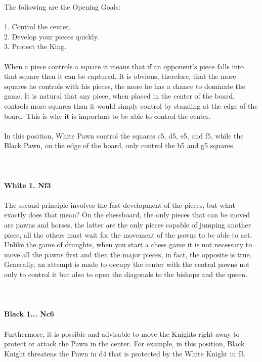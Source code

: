 \documentclass{article}
\begin{document}
The following are the Opening Goals:\\\\1. Control the center.\\2. Develop your pieces quickly.\\3. Protect the King.\\\\When a piece controls a square it means that if an opponent's piece falls into that square then it can be captured. It is obvious, therefore, that the more squares he controls with his pieces, the more he has a chance to dominate the game. It is natural that any piece, when placed in the center of the board, controls more squares than it would simply control by standing at the edge of the board. This is why it is important to be able to control the center.\\\\In this position, White Pawn control the squares c5, d5, e5, and f5, while the Black Pawn, on the edge of the board, only control the b5 and g5 squares.\\
\\

\\
\\
\textbf{White 1. Nf3}\\
\\
The second principle involves the fast development of the pieces, but what exactly does that mean? On the chessboard, the only pieces that can be moved are pawns and horses, the latter are the only pieces capable of jumping another piece, all the others must wait for the movement of the pawns to be able to act. Unlike the game of draughts, when you start a chess game it is not necessary to move all the pawns first and then the major pieces, in fact, the opposite is true.\\Generally, an attempt is made to occupy the center with the central pawns not only to control it but also to open the diagonals to the bishops and the queen.\\
\\

\\
\\
\textbf{Black 1... Nc6}\\
\\
Furthermore, it is possible and advisable to move the Knights right away to protect or attack the Pawn in the center. For example, in this position, Black Knight threatens the Pawn in d4 that is protected by the White Knight in f3.\\
\end{document}
